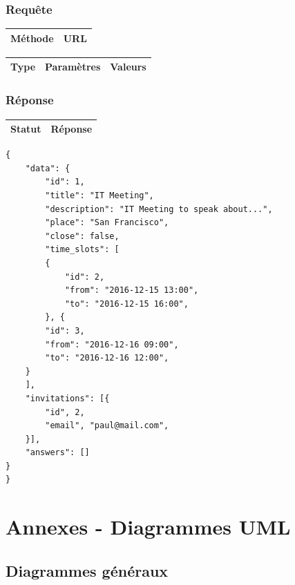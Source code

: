 \documentclass[titlepage]{report}
\begin{document}
\section{Requête}

\begin{center}
	\begin{tabular}{|c|c|}
		\hline
		Méthode & URL \\
		\hline
		
	\end{tabular}
\end{center}


\begin{center}
	\begin{tabular}{|c|c|c|}
		\hline
		Type & Paramètres & Valeurs \\
		\hline
		
	\end{tabular}
\end{center}


\section{Réponse}

\begin{center}
	\begin{tabular}{|c|c|}
		\hline
		Statut & Réponse \\
		\hline
		
	\end{tabular}
\end{center}


\lstset{language=XML} 

\begin{lstlisting}[frame=single]
{
	"data": {
		"id": 1,
		"title": "IT Meeting",
		"description": "IT Meeting to speak about...",
		"place": "San Francisco",
		"close": false,
		"time_slots": [
		{
			"id": 2,
			"from": "2016-12-15 13:00",
			"to": "2016-12-15 16:00",
		}, {
		"id": 3,
		"from": "2016-12-16 09:00",
		"to": "2016-12-16 12:00",
	}
	],
	"invitations": [{
		"id", 2,
		"email", "paul@mail.com",
	}],
	"answers": []
}
}

\end{lstlisting}


\part{Annexes - Diagrammes UML}
\label{part_allUML}

\chapter{Diagrammes généraux}
\end{document}
